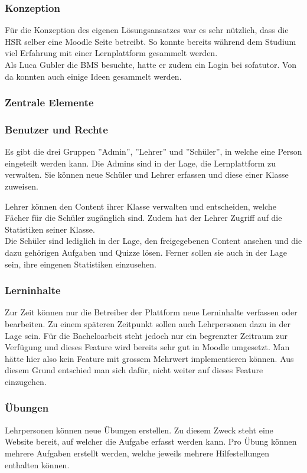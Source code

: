 \subsubsection{Konzeption}
Für die Konzeption des eigenen Lösungsansatzes war es sehr nützlich, dass die HSR selber eine Moodle Seite betreibt. So konnte bereits während dem Studium viel Erfahrung mit einer Lernplattform gesammelt werden. \\

\noindent Als Luca Gubler die BMS besuchte, hatte er zudem ein Login bei sofatutor. Von da konnten auch einige Ideen gesammelt werden. 


\subsubsection{Zentrale Elemente}
\subsubsection*{Benutzer und Rechte}
Es gibt die drei Gruppen ''Admin'', ''Lehrer'' und ''Schüler'', in welche eine Person eingeteilt werden kann. Die Admins sind in der Lage, die Lernplattform zu verwalten. Sie können neue Schüler und Lehrer erfassen und diese einer Klasse zuweisen. 

\noindent Lehrer können den Content ihrer Klasse verwalten und entscheiden, welche Fächer für die Schüler zugänglich sind. Zudem hat der Lehrer Zugriff auf die Statistiken seiner Klasse.  \\

\noindent Die Schüler sind lediglich in der Lage, den freigegebenen Content ansehen und die dazu gehörigen Aufgaben und Quizze lösen. Ferner sollen sie auch in der Lage sein, ihre eingenen Statistiken einzusehen.

\subsubsection*{Lerninhalte}
Zur Zeit können nur die Betreiber der Plattform neue Lerninhalte verfassen oder bearbeiten. Zu einem späteren Zeitpunkt sollen auch Lehrpersonen dazu in der Lage sein. Für die Bacheloarbeit steht jedoch nur ein begrenzter Zeitraum zur Verfügung  und dieses Feature wird bereits sehr gut in Moodle umgesetzt. Man hätte hier also kein Feature mit grossem Mehrwert implementieren können. Aus diesem Grund entschied man sich dafür, nicht weiter auf dieses Feature einzugehen. 

\subsubsection*{Übungen}
Lehrpersonen können neue Übungen erstellen. Zu diesem Zweck steht eine Website bereit, auf welcher die Aufgabe erfasst werden kann. Pro Übung können mehrere Aufgaben erstellt werden, welche jeweils mehrere Hilfestellungen enthalten können.







\newpage